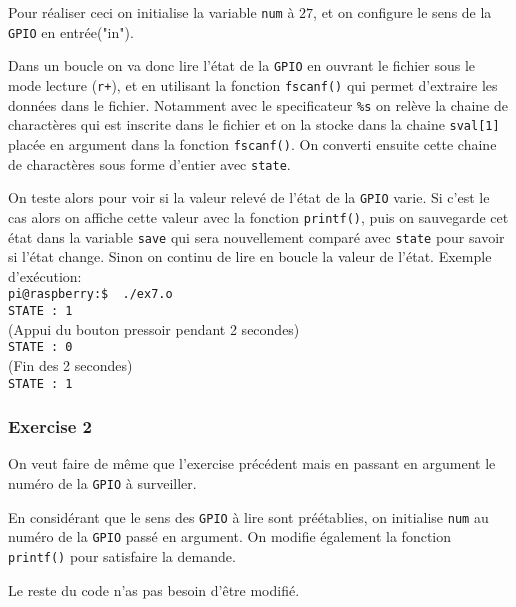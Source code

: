 \documentclass[11pt, openright]{book}
\begin{document}
Pour réaliser ceci on initialise la variable \texttt{num} à $27$, et on configure le sens de la \texttt{GPIO} en entrée("in").

Dans un boucle on va donc lire l'état de la \texttt{GPIO} en ouvrant le fichier sous le mode lecture (\texttt{r+}), et en utilisant la fonction \texttt{fscanf()} qui permet d'extraire les données dans le fichier. Notamment avec le specificateur \texttt{\%s} on relève la chaine de charactères qui est inscrite dans le fichier et on la stocke dans la chaine \texttt{sval[1]} placée en argument dans la fonction \texttt{fscanf()}. On converti ensuite cette chaine de charactères sous forme d'entier avec \texttt{state}.


On teste alors pour voir si la valeur relevé de l'état de la \texttt{GPIO} varie. Si c'est le cas alors on affiche cette valeur avec la fonction \texttt{printf()}, puis on sauvegarde cet état dans la variable \texttt{save} qui sera nouvellement comparé avec \texttt{state} pour savoir si l'état change. Sinon on continu de lire en boucle la valeur de l'état.
\newpage
Exemple d'exécution:\\
\texttt{pi@raspberry:\text{$\sim$}\$ \ ./ex7.o}\\
\texttt{STATE : 1}\\
(Appui du bouton pressoir pendant 2 secondes)\\
\texttt{STATE : 0}\\
(Fin des 2 secondes)\\
\texttt{STATE : 1}

\subsubsection{Exercise 2}

On veut faire de même que l'exercise précédent mais en passant en argument le numéro de la \texttt{GPIO} à surveiller.

En considérant que le sens des \texttt{GPIO} à lire sont préétablies, on initialise \texttt{num} au numéro de la \texttt{GPIO} passé en argument. On modifie également la fonction \texttt{printf()} pour satisfaire la demande.

Le reste du code n'as pas besoin d'être modifié.

\newpage
\end{document}
